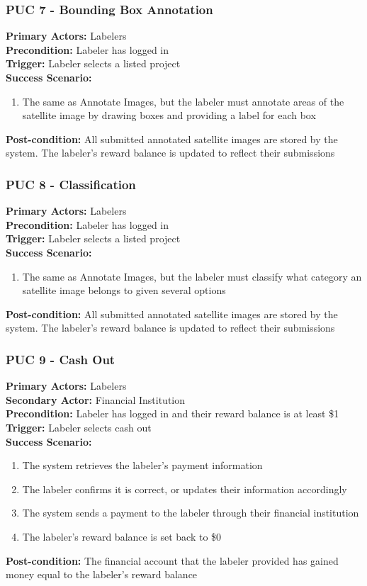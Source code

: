 \documentclass[12pt]{article}
\begin{document}
\subsubsection{PUC 7 - Bounding Box Annotation}
\textbf{Primary Actors:} Labelers\\ 
\textbf{Precondition:} Labeler has logged in\\
\textbf{Trigger:} Labeler selects a listed project\\
\textbf{Success Scenario:}
\begin{enumerate}
    \item The same as Annotate Images, but the labeler must annotate areas of the satellite image by drawing boxes and providing a label for each box
\end{enumerate}
\textbf{Post-condition:} All submitted annotated satellite images are stored by the system. The labeler's reward balance is updated to reflect their submissions

\subsubsection{PUC 8 - Classification}
\textbf{Primary Actors:} Labelers\\ 
\textbf{Precondition:} Labeler has logged in\\
\textbf{Trigger:} Labeler selects a listed project\\
\textbf{Success Scenario:}
\begin{enumerate}
    \item The same as Annotate Images, but the labeler must classify what category an satellite image belongs to given several options
\end{enumerate}
\textbf{Post-condition:} All submitted annotated satellite images are stored by the system. The labeler's reward balance is updated to reflect their submissions

\subsubsection{PUC 9 - Cash Out}
\textbf{Primary Actors:} Labelers\\
\textbf{Secondary Actor:} Financial Institution\\
\textbf{Precondition:} Labeler has logged in and their reward balance is at least \$1\\
\textbf{Trigger:} Labeler selects cash out\\
\textbf{Success Scenario:}
\begin{enumerate}
    \item The system retrieves the labeler's payment information
    \item The labeler confirms it is correct, or updates their information accordingly
    \item The system sends a payment to the labeler through their financial institution
    \item The labeler's reward balance is set back to \$0
\end{enumerate}
\textbf{Post-condition:} The financial account that the labeler provided has gained money equal to the labeler's reward balance
\end{document}
